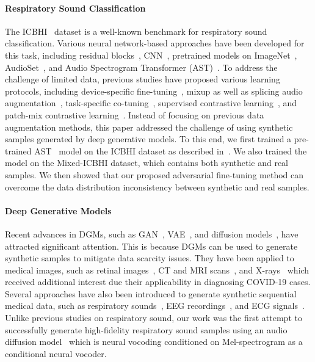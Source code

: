 \documentclass{article}
\begin{document}
\paragraph{Respiratory Sound Classification} The ICBHI~\cite{rocha2018alpha} dataset is a well-known benchmark for respiratory sound classification. Various neural network-based approaches have been developed for this task, including residual blocks~\cite{gairola2021respirenet, nguyen2022lung, wang2022domain}, CNN~\cite{moummad2022supervised}, pretrained models on ImageNet~\cite{gairola2021respirenet, nguyen2022lung, wang2022domain}, AudioSet~\cite{moummad2022supervised}, and Audio Spectrogram Transformer (AST)~\cite{gong21b_interspeech}. To address the challenge of limited data, previous studies have proposed various learning protocols, including device-specific fine-tuning~\cite{gairola2021respirenet}, mixup as well as splicing audio augmentation~\cite{wang2022domain}, task-specific co-tuning~\cite{nguyen2022lung}, supervised contrastive learning~\cite{moummad2022supervised}, and patch-mix contrastive learning~\cite{bae23b_interspeech}. Instead of focusing on previous data augmentation methods, this paper addressed the challenge of using synthetic samples generated by deep generative models. To this end, we first trained a pre-trained AST~\cite{bae23b_interspeech} model on the ICBHI dataset as described in~\cite{gong21b_interspeech}. We also trained the model on the Mixed-ICBHI dataset, which contains both synthetic and real samples. We then showed that our proposed adversarial fine-tuning method can overcome the data distribution inconsistency between synthetic and real samples.



\paragraph{Deep Generative Models} Recent advances in DGMs, such as GAN~\cite{goodfellow2014generative}, VAE~\cite{kingma2013auto}, and diffusion models~\cite{ho2020denoising}, have attracted significant attention. This is because DGMs can be used to generate synthetic samples to mitigate data scarcity issues. They have been applied to medical images, such as retinal images~\cite{costa2017end,iqbal2018generative}, CT and MRI scans~\cite{nie2017medical, shin2018medical, bowles2018gan, sandfort2019data, han2019synthesizing, armanious2020medgan, wolleb2022diffusion, dorjsembe2022threedimensional}, and X-rays~\cite{loey2020within, motamed2021data} which received additional interest due their applicability in diagnosing COVID-19 cases. Several approaches have also been introduced to generate synthetic sequential medical data, such as respiratory sounds~\cite{kochetov2020generative, jayalakshmy2021conditional, saldanha2022data}, EEG recordings~\cite{fahimi2019towards, hazra2020synsiggan, tian2023dual}, and ECG signals~\cite{narvaez2020synthesis, wulan2020generating}.
Unlike previous studies on respiratory sound, our work was the first attempt to successfully generate high-fidelity respiratory sound samples using an audio diffusion model~\cite{kong2020diffwave} which is neural vocoding conditioned on Mel-spectrogram as a conditional neural vocoder.
\end{document}
